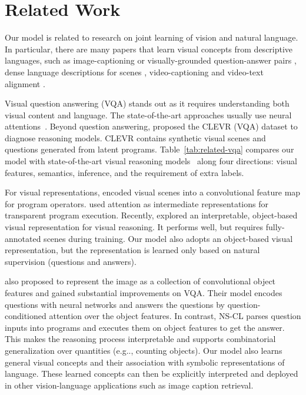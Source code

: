 \documentclass{article} \usepackage{iclr2019_conference,times}
\makeatletter
\newcommand{\tbl}[1]{Table~\ref{#1}}
\DeclareRobustCommand\onedot{\futurelet\@let@token\@onedot}
\def\@onedot{\ifx\@let@token.\else.\null\fi\xspace}
\def\eg{e.g\onedot} \def\Eg{E.g\onedot}
\newcommand{\model}{NS-CL\xspace}
\newcommand{\revisioncolor}{}
\makeatother
\begin{document}
\section{Related Work}

Our model is related to research on joint learning of vision and natural language. In particular, there are many papers that learn visual concepts from descriptive languages, such as image-captioning or visually-grounded question-answer pairs \citep{kiros2014unifying,shi2018learning,mao2016training,vendrov2015order,ganju2017what}, dense language descriptions for scenes \citep{densecap}, video-captioning \citep{Donahue2015Long} and video-text alignment \citep{zhu2015aligning}.

Visual question answering (VQA) stands out as it requires understanding both visual content and language. The state-of-the-art approaches usually use neural attentions~\citep{malinowski2014multi,chen2015abc,Yang2016Stacked,xu2016ask}.  Beyond question answering, \cite{Johnson2017CLEVR} proposed the CLEVR (VQA) dataset to diagnose reasoning models. CLEVR contains synthetic visual scenes and questions generated from latent programs. \tbl{tab:related-vqa} compares our model with state-of-the-art visual reasoning models~\citep{Andreas2016Learning,Suarez2018DDRprog,Santoro2017simple} along four directions: visual features, semantics, inference, and the requirement of extra labels.

For visual representations, \cite{Johnson2017Inferring} encoded visual scenes into a convolutional feature map for program operators. \cite{Mascharka2018Transparency,Hudson2018Compositional} used attention as intermediate representations for transparent program execution. Recently, \cite{kexin} explored an interpretable, object-based visual representation for visual reasoning. It performs well, but requires fully-annotated scenes during training. Our model also adopts an object-based visual representation, but the representation is learned only based on natural supervision (questions and answers).

{\revisioncolor \cite{Anderson2017BottomUp} also proposed to represent the image as a collection of convolutional object features and gained substantial improvements on VQA. Their model encodes questions with neural networks and answers the questions by question-conditioned attention over the object features. In contrast, \model parses question inputs into programs and executes them on object features to get the answer. This makes the reasoning process interpretable and supports combinatorial generalization over quantities (\eg, counting objects). Our model also learns general visual concepts and their association with symbolic representations of language. These learned concepts can then be explicitly interpreted and deployed in other vision-language applications such as image caption retrieval.}
\end{document}
